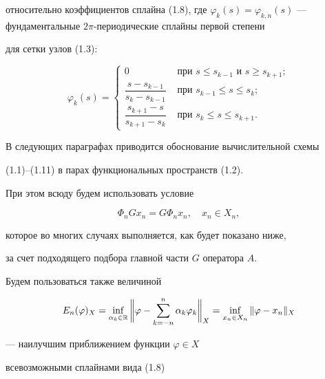 относительно коэффициентов сплайна (1.8), где $\varphi_k (s)=\varphi_{k,


n}(s)$ --- фундаментальные $2\pi$-периодические сплайны первой степени


для сетки узлов (1.3):


\begin{equation}


\varphi_{k}(s)=


\begin{cases}


0 & \text{ при } s \le s_{k-1} \text{ и } s \ge s_{k+1}; \\


\dfrac{s-s_{k-1}}{s_{k}-s_{k-1}} & \text{ при } s_{k-1} \le s \le s_{k}; \\


\dfrac{s_{k+1}-s}{s_{k+1}-s_k} & \text{ при } s_k \le s \le s_{k+1}.


\end{cases}


\end{equation}





В следующих параграфах приводится обоснование вычислительной схемы


(1.1)--(1.11) в парах функциональных пространств (1.2).


При этом всюду будем использовать условие


\begin{equation}


\Phi_{n}Gx_{n}=G \Phi_{n}x_{n}, \quad x_{n} \in X_n,


\end{equation}


которое во многих случаях выполняется, как будет показано ниже,


за счет подходящего подбора главной части $G$ оператора $A$.


Будем пользоваться также величиной


$$


E_{n}(\varphi)_{X}=\inf_{\alpha_{k} \in \R}


\bigg\| \varphi - \sum_{k=-n}^{n} \alpha_{k}\varphi_{k}\bigg\|_X=


\inf_{x_n \in X_n} \|\varphi - x_n \|_{X}


$$


--- наилучшим приближением функции $\varphi \in X$ 


всевозможными сплайнами вида (1.8)


